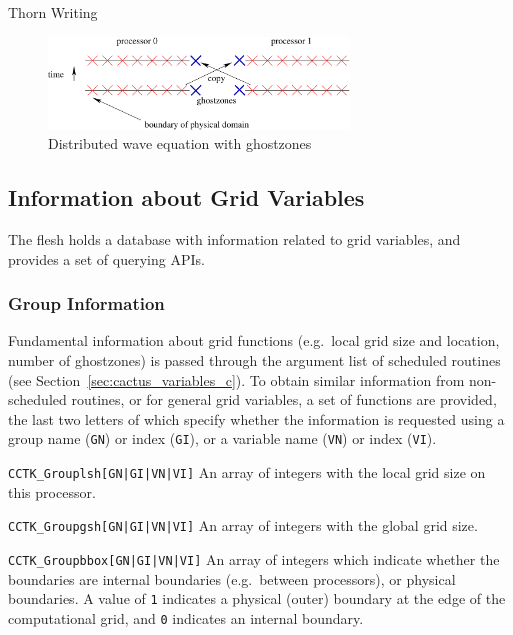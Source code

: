 \begin{cactuspart}{Thorn Writing}
\begin{figure}[ht]
\begin{center}
\includegraphics[angle=0,width=8cm]{withghost}
\end{center}
\caption{Distributed wave equation with ghostzones}
\label{fig:withghost}
\end{figure}


\subsection{Information about Grid Variables}

The flesh holds a database with information related to grid variables, and
provides a set of querying APIs.

\subsubsection{Group Information}

Fundamental information about grid functions (e.g.\ local grid size and
location, number of ghostzones) is passed through the argument list of
scheduled routines (see Section~\ref{sec:cactus_variables_c}). To obtain similar information
from non-scheduled routines, or for general grid variables, a set of
functions are provided, the last two letters of which specify whether
the information is requested using a group name (\texttt{GN}) or index
(\texttt{GI}), or a variable name (\texttt{VN}) or index (\texttt{VI}).

\begin{Lentry}

\item [\texttt{CCTK\_Grouplsh[GN|GI|VN|VI]}]    An array of integers
      with the local grid size on this processor.

\item [\texttt{CCTK\_Groupgsh[GN|GI|VN|VI]}]    An array of integers
      with the global grid size.

\item [\texttt{CCTK\_Groupbbox[GN|GI|VN|VI]}]      An array of  integers
      which indicate whether the boundaries are internal boundaries
      (e.g.\ between processors), or physical boundaries.
        A value of \texttt{1} indicates
      a physical (outer) boundary at the edge of the computational grid,
      and \texttt{0} indicates an internal boundary.


\end{Lentry}
\end{cactuspart}
